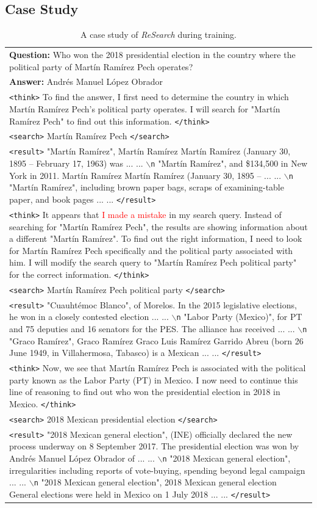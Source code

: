 \documentclass{article}
\newcommand{\thinkrow}[1]{\rowcolor{blue!10} \texttt{<think>} #1 \texttt{</think>} \\}
\newcommand{\searchrow}[1]{\rowcolor{green!10} \texttt{<search>} #1 \texttt{</search>} \\}
\newcommand{\resultrow}[1]{\rowcolor{gray!10} \texttt{<result>} #1 \texttt{</result>} \\}
\begin{document}
\subsection{Case Study}

\begin{table}[htbp]
  \caption{A case study of \textit{ReSearch} during training.}
  \label{tab:case-study}
  \begin{center}
  \begin{tabular}{p{}}
  \toprule
  \textbf{Question:} Who won the 2018 presidential election in the country where the political party of Martín Ramírez Pech operates? \\
  \textbf{Answer:} Andrés Manuel López Obrador \\
  \midrule 
  \thinkrow{To find the answer, I first need to determine the country in which Martín Ramírez Pech's political party operates. I will search for "Martín Ramírez Pech" to find out this information.}
  \searchrow{Martín Ramírez Pech}
  \resultrow{"Martín Ramírez", Martín Ramírez Martín Ramírez (January 30, 1895 – February 17, 1963) was ... ... \texttt{$\backslash$n} "Martín Ramírez", and \$134,500 in New York in 2011. Martín Ramírez Martín Ramírez (January 30, 1895 – ... ... \texttt{$\backslash$n} "Martín Ramírez", including brown paper bags, scraps of examining-table paper, and book pages ... ...}
  \thinkrow{It appears that \textcolor{red}{I made a mistake} in my search query. Instead of searching for "Martín Ramírez Pech", the results are showing information about a different "Martín Ramírez". To find out the right information, I need to look for Martín Ramírez Pech specifically and the political party associated with him. I will modify the search query to "Martín Ramírez Pech political party" for the correct information.}
  \searchrow{Martín Ramírez Pech political party}
  \resultrow{"Cuauhtémoc Blanco", of Morelos. In the 2015 legislative elections, he won in a closely contested election ... ... \texttt{$\backslash$n} "Labor Party (Mexico)", for PT and 75 deputies and 16 senators for the PES. The alliance has received ... ... \texttt{$\backslash$n} "Graco Ramírez", Graco Ramírez Graco Luis Ramírez Garrido Abreu (born 26 June 1949, in Villahermosa, Tabasco) is a Mexican ... ...}
  \thinkrow{Now, we see that Martín Ramírez Pech is associated with the political party known as the Labor Party (PT) in Mexico. I now need to continue this line of reasoning to find out who won the presidential election in 2018 in Mexico.}
  \searchrow{2018 Mexican presidential election}
  \resultrow{"2018 Mexican general election", (INE) officially declared the new process underway on 8 September 2017. The presidential election was won by Andrés Manuel López Obrador of ... ... \texttt{$\backslash$n} "2018 Mexican general election", irregularities including reports of vote-buying, spending beyond legal campaign ... ... \texttt{$\backslash$n} "2018 Mexican general election", 2018 Mexican general election General elections were held in Mexico on 1 July 2018 ... ...}

\end{tabular}
\end{center}
\end{table}
\end{document}

